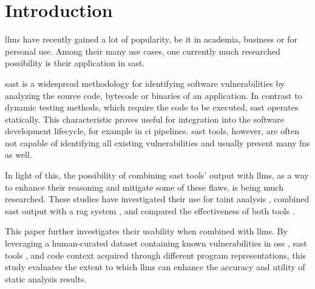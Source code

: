 \section{Introduction}
\label{sec:intro}
\Acp{llm} have recently gained a lot of popularity, be it in academia, business or for personal use.
Among their many use cases, one currently much researched possibility is their application in \ac{sast}.

\Acl{sast} is a widespread methodology for identifying software vulnerabilities by analyzing the source code, bytecode or binaries of an application.
In contrast to dynamic testing methods, which require the code to be executed, \ac{sast} operates statically.
This characteristic proves useful for integration into the software development lifecycle, for example in \ac{ci} pipelines.
\ac{sast} tools, however, are often not capable of identifying all existing vulnerabilities and usually present many \acp{fn} \cite{10.1145/3533767.3534380} as well.

In light of this, the possibility of combining \ac{sast} tools' output with \acp{llm}, as a way to enhance their reasoning and mitigate some of these flaws, is being much researched.
These studies have investigated their use for taint analysis \cite{li2024llmassistedstaticanalysisdetecting}, combined \ac{sast} output with a \ac{rag} system \cite{du2024vulragenhancingllmbasedvulnerability,keltek2024boostingcybersecurityvulnerabilityscanning}, and compared the effectiveness of both tools \cite{zhou2024comparisonstaticapplicationsecurity}.

This paper further investigates their usability when combined with \acp{llm}. 
By leveraging a human-curated dataset containing known vulnerabilities in \ac{oss} \cite{BugOSS}, \ac{sast} tools \cite{codeql,infer}, and code context acquired through different program representations, this study evaluates the extent to which \acp{llm} can enhance the accuracy and utility of static analysis results.